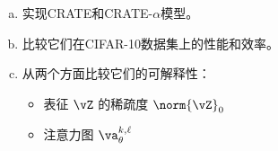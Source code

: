 \documentclass[../../book-main_zh.tex]{subfiles}
\begin{document}
\begin{exercise}
\phantom{}
\begin{enumerate}[(a)]
\item 实现CRATE和CRATE-\(\alpha\)模型。
\item 比较它们在CIFAR-10数据集上的性能和效率。
\item 从两个方面比较它们的可解释性：
    \begin{itemize}
        \item 表征 \(\vZ\) 的稀疏度 \(\norm{\vZ}_{0}\)
        \item 注意力图 \(\va_{\theta}^{k, \ell}\)
    \end{itemize}
\end{enumerate}
\end{exercise}
\end{document}
